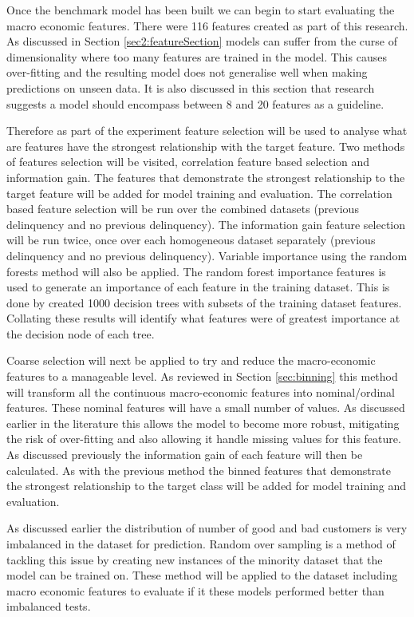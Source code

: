 Once the benchmark model has been built we can begin to start evaluating the macro economic features. There were 116 features created as part of this research. As discussed in Section \ref{sec2:featureSection} models can suffer from the curse of dimensionality where too many features are trained in the model. This causes over-fitting and the resulting model does not generalise well when making predictions on unseen data. It is also discussed in this section that research suggests a model should encompass between 8 and 20 features as a guideline.

Therefore as part of the experiment feature selection will be used to analyse what are features have the strongest relationship with the target feature. Two methods of features selection will be visited, correlation feature based selection and information gain. The features that demonstrate the strongest relationship to the target feature will be added for model training and evaluation. The correlation based feature selection will be run over the combined datasets (previous delinquency and no previous delinquency). The information gain feature selection will be run twice, once over each homogeneous dataset separately (previous delinquency and no previous delinquency). Variable importance using the random forests method will also be applied. The random forest importance features is used to generate an importance of each feature in the training dataset. This is done by created 1000 decision trees with subsets of the training dataset features. Collating these results will identify what features were of greatest importance at the decision node of each tree.

Coarse selection will next be applied to try and reduce the macro-economic features to a manageable level. As reviewed in Section \ref{sec:binning} this method will transform all the continuous macro-economic features into nominal/ordinal features. These nominal features will have a small number of values. As discussed earlier in the literature this allows the model to become more robust, mitigating the risk of over-fitting and also allowing it handle missing values for this feature. As discussed previously the information gain of each feature will then be calculated. As with the previous method the binned features that demonstrate the strongest relationship to the target class will be added for model training and evaluation. 

As discussed earlier the distribution  of number of good and bad customers is very imbalanced in the dataset for prediction. Random over sampling is a method of tackling this issue by creating new instances of the minority dataset that the model can be trained on. These method will be applied to the dataset including macro economic features to evaluate if it these models performed better than imbalanced tests.


